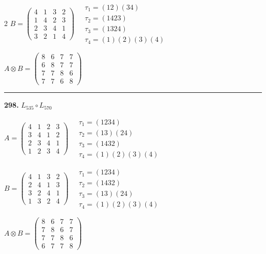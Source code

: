 \begin{multicols}{2}
$B = \begin{pmatrix} 4 & 1 & 3 & 2 \\ 1 & 4 & 2 & 3 \\ 2 & 3 & 4 & 1 \\ 3 & 2 & 1 & 4 \end{pmatrix} \quad \begin{matrix} \tau_{1}=(1 2)(3 4) \\ \tau_{2}=(1 4 2 3) \\ \tau_{3}=(1 3 2 4) \\ \tau_{4}=(1)(2)(3)(4) \end{matrix}$

$A \otimes B = \begin{pmatrix} 8 & 6 & 7 & 7 \\ 6 & 8 & 7 & 7 \\ 7 & 7 & 8 & 6 \\ 7 & 7 & 6 & 8 \end{pmatrix}$

\vspace{0.3em}
\hrule
\vspace{0.3em}

\noindent\textbf{298.} $L_{535} \circ L_{570}$

$A = \begin{pmatrix} 4 & 1 & 2 & 3 \\ 3 & 4 & 1 & 2 \\ 2 & 3 & 4 & 1 \\ 1 & 2 & 3 & 4 \end{pmatrix} \quad \begin{matrix} \tau_{1}=(1 2 3 4) \\ \tau_{2}=(1 3)(2 4) \\ \tau_{3}=(1 4 3 2) \\ \tau_{4}=(1)(2)(3)(4) \end{matrix}$

$B = \begin{pmatrix} 4 & 1 & 3 & 2 \\ 2 & 4 & 1 & 3 \\ 3 & 2 & 4 & 1 \\ 1 & 3 & 2 & 4 \end{pmatrix} \quad \begin{matrix} \tau_{1}=(1 2 3 4) \\ \tau_{2}=(1 4 3 2) \\ \tau_{3}=(1 3)(2 4) \\ \tau_{4}=(1)(2)(3)(4) \end{matrix}$

$A \otimes B = \begin{pmatrix} 8 & 6 & 7 & 7 \\ 7 & 8 & 6 & 7 \\ 7 & 7 & 8 & 6 \\ 6 & 7 & 7 & 8 \end{pmatrix}$


\end{multicols}
